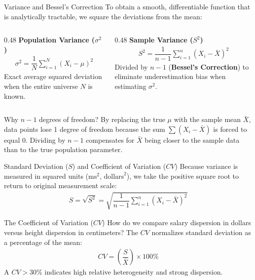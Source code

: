 \documentclass[aspectratio=169,xcolor={dvipsnames,table}]{beamer}
\begin{document}
\begin{frame}{Variance and Bessel's Correction}
  \scriptsize
  \vspace{-0.15cm}
  To obtain a smooth, differentiable function that is analytically tractable, we square the deviations from the mean: \pause
  
  \begin{columns}[T]
    \begin{column}{0.48\textwidth}
      {\small \color{TecAzulOscuro}\textbf{Population Variance ($\sigma^2$)}}
      \vspace{-0.1em}
      \begin{align}
        \sigma^2 = \dfrac{1}{N} \sum_{i=1}^{N} (X_i - \mu)^2
      \end{align}
      \small Exact average squared deviation when the entire universe $N$ is known.
    \end{column}
    
    \begin{column}{0.48\textwidth}
      {\small \color{TecRojo}\textbf{Sample Variance ($S^2$)}}
      \vspace{-0.1em}
      \begin{align}
        S^2 = \dfrac{1}{n - 1} \sum_{i=1}^{n} (X_i - \bar{X})^2
      \end{align}
      \small Divided by $n-1$ (\textbf{Bessel's Correction}) to eliminate underestimation bias when estimating $\sigma^2$.
    \end{column}
  \end{columns}
  \vspace{-0.1em}
  \pause
  \begin{block}{Why $n-1$ degrees of freedom?}
    By replacing the true $\mu$ with the sample mean $\bar{X}$, data points lose 1 degree of freedom because the sum $\sum(X_i - \bar{X})$ is forced to equal 0. Dividing by $n-1$ compensates for $\bar{X}$ being closer to the sample data than to the true population parameter.
  \end{block}
\end{frame}

\begin{frame}{Standard Deviation ($S$) and Coefficient of Variation ($CV$)}
  Because variance is measured in squared units ($\text{ms}^2$, $\text{dollars}^2$), we take the positive square root to return to original measurement scale:
  \begin{align}
    S = \sqrt{S^2} = \sqrt{\dfrac{1}{n-1} \sum_{i=1}^{n} (X_i - \bar{X})^2}
  \end{align}
  \pause
  \begin{block}{The Coefficient of Variation ($CV$)}
    How do we compare salary dispersion in dollars versus height dispersion in centimeters? The $CV$ normalizes standard deviation as a percentage of the mean:
    \begin{align}
      CV = \left( \dfrac{S}{\bar{X}} \right) \times 100\%
    \end{align}
    A $CV > 30\%$ indicates high relative heterogeneity and strong dispersion.
  \end{block}
\end{frame}
\end{document}
